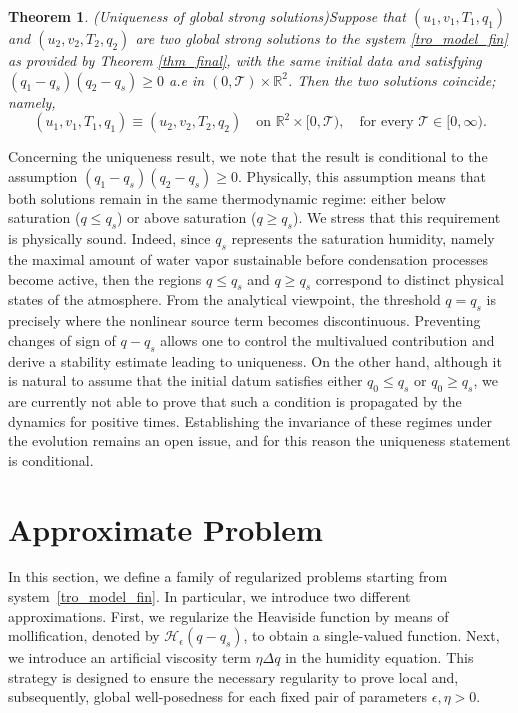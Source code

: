 \documentclass[11pt, a4paper, article,reqno,]{amsart}
\newtheorem{theorem}{Theorem}[section]
\theoremstyle{remark}
\numberwithin{equation}{section}
\begin{document}
\begin{theorem}(Uniqueness of global strong solutions)\label{teo:uniqueness}
Suppose that $(u_1, v_1, T_1, q_1)$ and $(u_2, v_2, T_2, q_2)$ are two global strong solutions to the system \eqref{tro_model_fin} as provided by Theorem \ref{thm_final}, with the same initial data and satisfying $(q_1 - q_s)(q_2 - q_s) \ge 0$ a.e in $(0,\mathcal{T}) \times \mathbb{R}^2$. Then the two solutions coincide; namely,
\begin{equation*}
(u_1, v_1, T_1, q_1) \equiv (u_2, v_2, T_2, q_2)
\quad \text{on } \mathbb{R}^2 \times [0,\mathcal{T}),
\quad \text{for every } \mathcal{T} \in [0,\infty).    
\end{equation*}
\end{theorem}
Concerning the uniqueness result, we note that the result is conditional to the assumption $(q_1 - q_s)(q_2 - q_s) \ge 0$. Physically, this assumption means that both solutions remain in the same thermodynamic regime: either below saturation ($q\leq q_s$) or above saturation ($q\geq q_s$). We stress that this requirement is physically sound. Indeed, since $q_s$ represents the saturation humidity, namely the maximal amount of water vapor sustainable before condensation processes become active, then the regions $q\leq q_s$ and $q\geq q_s$ correspond to distinct physical states of the atmosphere.
From the analytical viewpoint, the threshold $q=q_s$ is precisely where the nonlinear source term becomes discontinuous. Preventing changes of sign of $q-q_s$ allows one to control the multivalued contribution and derive a stability estimate leading to uniqueness. On the other hand, although it is natural to assume that the initial datum satisfies either $q_0\leq q_s$ or $q_0\geq q_s$, we are currently not able to prove that such a condition is propagated by the dynamics for positive times. Establishing the invariance of these regimes under the evolution remains an open issue, and for this reason the uniqueness statement is conditional.




\section{Approximate Problem}\label{sec:4}

In this section, we define a family of regularized problems starting from system~\eqref{tro_model_fin}. In particular, we introduce two different approximations. First, we regularize the Heaviside function by means of mollification, denoted by \(\mathcal{H}_\epsilon(q - q_s)\), to obtain a single-valued function. Next, we introduce an artificial viscosity term \(\eta \Delta q\) in the humidity equation. This strategy is designed to ensure the necessary regularity to prove local and, subsequently, global well-posedness for each fixed pair of parameters \(\epsilon, \eta > 0\).
\end{document}
